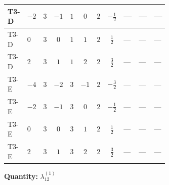 \documentclass[8pt]{article}
\begin{document}
\begin{landscape}
\begin{longtable}{@{}llcccccc >{\raggedright\arraybackslash}p{0.21\linewidth} >{\raggedright\arraybackslash}p{0.21\linewidth} >{\raggedright\arraybackslash}p{0.21\linewidth}@{}}
\midrule
T3-D & $-2$ & $3$ & $-1$ & $1$ & $0$ & $2$ & $-\frac{1}{2}$ & --- & --- & --- \\
\midrule
T3-D & $0$ & $3$ & $0$ & $1$ & $1$ & $2$ & $\frac{1}{2}$ & --- & --- & --- \\
\midrule
T3-D & $2$ & $3$ & $1$ & $1$ & $2$ & $2$ & $\frac{3}{2}$ & --- & --- & --- \\
\midrule
T3-E & $-4$ & $3$ & $-2$ & $3$ & $-1$ & $2$ & $-\frac{3}{2}$ & --- & --- & --- \\
\midrule
T3-E & $-2$ & $3$ & $-1$ & $3$ & $0$ & $2$ & $-\frac{1}{2}$ & --- & --- & --- \\
\midrule
T3-E & $0$ & $3$ & $0$ & $3$ & $1$ & $2$ & $\frac{1}{2}$ & --- & --- & --- \\
\midrule
T3-E & $2$ & $3$ & $1$ & $3$ & $2$ & $2$ & $\frac{3}{2}$ & --- & --- & --- \\
\midrule
\bottomrule
\end{longtable}
\clearpage
\noindent\textbf{Quantity: }$\lambda_{12}^{(1)}$\par\smallskip

\end{landscape}
\end{document}
